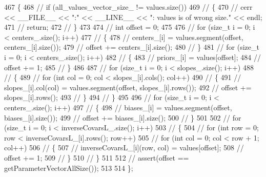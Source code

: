 \begin{DoxyCode}
467 \{
468   \textcolor{comment}{// if (all\_values\_vector\_size\_ != values.size())}
469   \textcolor{comment}{// \{}
470   \textcolor{comment}{//   cerr << \_\_FILE\_\_ << ":" << \_\_LINE\_\_ << ": values is of wrong size." << endl;}
471   \textcolor{comment}{//   return;}
472   \textcolor{comment}{// \}}
473   
474   \textcolor{comment}{// int offset = 0;}
475 
476   \textcolor{comment}{// for (size\_t i = 0; i < centers\_.size(); i++)}
477   \textcolor{comment}{// \{}
478   \textcolor{comment}{//   centers\_[i] = values.segment(offset, centers\_[i].size());}
479   \textcolor{comment}{//   offset += centers\_[i].size();}
480   \textcolor{comment}{// \}}
481   \textcolor{comment}{// for (size\_t i = 0; i < centers\_.size(); i++)}
482   \textcolor{comment}{// \{}
483   \textcolor{comment}{//   priors\_[i] = values[offset];}
484   \textcolor{comment}{//   offset += 1;}
485   \textcolor{comment}{// \}}
486 
487   \textcolor{comment}{// for (size\_t i = 0; i < slopes\_.size(); i++)}
488   \textcolor{comment}{// \{}
489   \textcolor{comment}{//   for (int col = 0; col < slopes\_[i].cols(); col++)}
490   \textcolor{comment}{//   \{}
491   \textcolor{comment}{//     slopes\_[i].col(col) = values.segment(offset, slopes\_[i].rows());}
492   \textcolor{comment}{//     offset += slopes\_[i].rows();}
493   \textcolor{comment}{//   \}}
494   \textcolor{comment}{// \}}
495 
496   \textcolor{comment}{// for (size\_t i = 0; i < centers\_.size(); i++)}
497   \textcolor{comment}{// \{}
498   \textcolor{comment}{//   biases\_[i] = values.segment(offset, biases\_[i].size());}
499   \textcolor{comment}{//   offset += biases\_[i].size();}
500   \textcolor{comment}{// \}}
501 
502   \textcolor{comment}{// for (size\_t i = 0; i < inverseCovarsL\_.size(); i++)}
503   \textcolor{comment}{// \{}
504   \textcolor{comment}{//   for (int row = 0; row < inverseCovarsL\_[i].rows(); row++)}
505   \textcolor{comment}{//     for (int col = 0; col < row + 1; col++)}
506   \textcolor{comment}{//     \{}
507   \textcolor{comment}{//       inverseCovarsL\_[i](row, col) = values[offset];}
508   \textcolor{comment}{//       offset += 1;}
509   \textcolor{comment}{//     \}}
510   \textcolor{comment}{// \}}
511   
512   \textcolor{comment}{// assert(offset == getParameterVectorAllSize());}
513 
514 \};
\end{DoxyCode}


